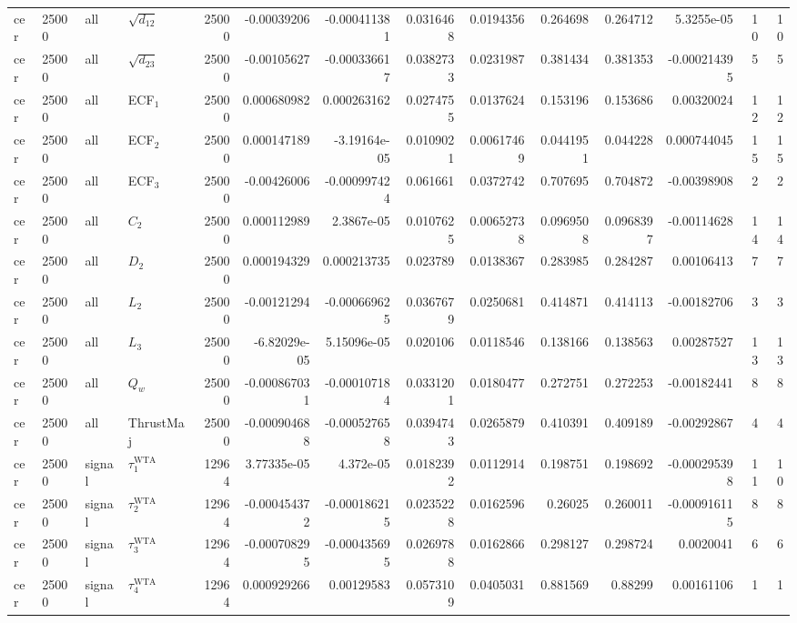 \begin{landscape}
\begin{longtable}{llll r rrrr rr r rr}
cer & 25000 & all & $\sqrt{d_{12}}$ & 25000 & -0.00039206 & -0.000411381 & 0.0316468 & 0.0194356 & 0.264698 & 0.264712 & 5.3255e-05 & 10 & 10 \\
cer & 25000 & all & $\sqrt{d_{23}}$ & 25000 & -0.00105627 & -0.000336617 & 0.0382733 & 0.0231987 & 0.381434 & 0.381353 & -0.000214395 & 5 & 5 \\
cer & 25000 & all & ECF$_1$ & 25000 & 0.000680982 & 0.000263162 & 0.0274755 & 0.0137624 & 0.153196 & 0.153686 & 0.00320024 & 12 & 12 \\
cer & 25000 & all & ECF$_2$ & 25000 & 0.000147189 & -3.19164e-05 & 0.0109021 & 0.00617469 & 0.0441951 & 0.044228 & 0.000744045 & 15 & 15 \\
cer & 25000 & all & ECF$_3$ & 25000 & -0.00426006 & -0.000997424 & 0.061661 & 0.0372742 & 0.707695 & 0.704872 & -0.00398908 & 2 & 2 \\
cer & 25000 & all & $C_2$ & 25000 & 0.000112989 & 2.3867e-05 & 0.0107625 & 0.00652738 & 0.0969508 & 0.0968397 & -0.00114628 & 14 & 14 \\
cer & 25000 & all & $D_2$ & 25000 & 0.000194329 & 0.000213735 & 0.023789 & 0.0138367 & 0.283985 & 0.284287 & 0.00106413 & 7 & 7 \\
cer & 25000 & all & $L_2$ & 25000 & -0.00121294 & -0.000669625 & 0.0367679 & 0.0250681 & 0.414871 & 0.414113 & -0.00182706 & 3 & 3 \\
cer & 25000 & all & $L_3$ & 25000 & -6.82029e-05 & 5.15096e-05 & 0.020106 & 0.0118546 & 0.138166 & 0.138563 & 0.00287527 & 13 & 13 \\
cer & 25000 & all & $Q_w$ & 25000 & -0.000867031 & -0.000107184 & 0.0331201 & 0.0180477 & 0.272751 & 0.272253 & -0.00182441 & 8 & 8 \\
cer & 25000 & all & ThrustMaj & 25000 & -0.000904688 & -0.000527658 & 0.0394743 & 0.0265879 & 0.410391 & 0.409189 & -0.00292867 & 4 & 4 \\
cer & 25000 & signal & $\tau_1^{\mathrm{WTA}}$ & 12964 & 3.77335e-05 & 4.372e-05 & 0.0182392 & 0.0112914 & 0.198751 & 0.198692 & -0.000295398 & 11 & 10 \\
cer & 25000 & signal & $\tau_2^{\mathrm{WTA}}$ & 12964 & -0.000454372 & -0.000186215 & 0.0235228 & 0.0162596 & 0.26025 & 0.260011 & -0.000916115 & 8 & 8 \\
cer & 25000 & signal & $\tau_3^{\mathrm{WTA}}$ & 12964 & -0.000708295 & -0.000435695 & 0.0269788 & 0.0162866 & 0.298127 & 0.298724 & 0.0020041 & 6 & 6 \\
cer & 25000 & signal & $\tau_4^{\mathrm{WTA}}$ & 12964 & 0.000929266 & 0.00129583 & 0.0573109 & 0.0405031 & 0.881569 & 0.88299 & 0.00161106 & 1 & 1 \\

\end{longtable}
\end{landscape}
